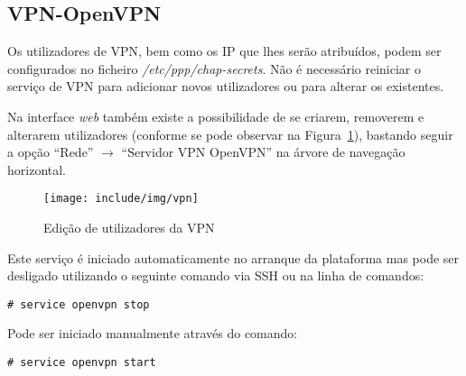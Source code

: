 \subsection*{VPN-OpenVPN}

Os utilizadores de VPN, bem como os IP que lhes serão atribuídos, podem ser
configurados no ficheiro \emph{/etc/ppp/chap-secrets}.
Não é necessário reiniciar o serviço de VPN para adicionar novos utilizadores ou para alterar os existentes.

Na interface \textit{web} também existe a possibilidade de se criarem, removerem e alterarem
utilizadores (conforme se pode observar na Figura~\ref{fig:vpn}), bastando seguir a opção ``Rede'' $\rightarrow$ ``Servidor VPN OpenVPN'' na árvore de navegação horizontal.

\begin{figure}[H]
\begin{center}
\texttt{[image: include/img/vpn]}
\end{center}
\caption{Edição de utilizadores da VPN}
\label{fig:vpn}
\end{figure}

Este serviço é iniciado automaticamente no arranque da plataforma mas pode ser desligado utilizando o seguinte comando via SSH ou na linha de comandos:

\begin{verbatim}
# service openvpn stop
\end{verbatim}

Pode ser iniciado manualmente através do comando:

\begin{verbatim}
# service openvpn start
\end{verbatim}
